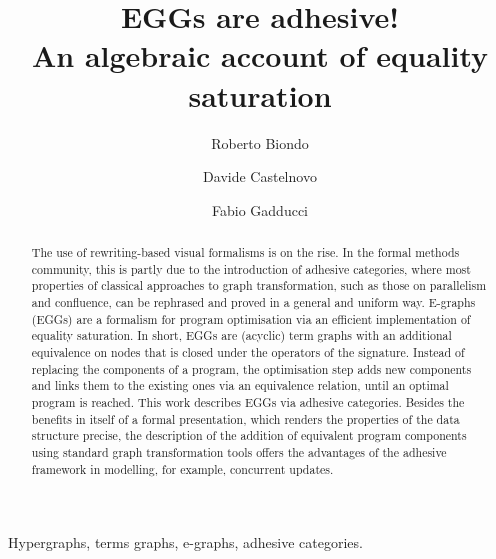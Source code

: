\documentclass[3p]{elsarticle}
\title{EGGs are adhesive!\\ An algebraic account of equality saturation}
\theoremstyle{remark}
\theoremstyle{definition}
\begin{document}
\author[1]{Roberto Biondo}

\author[1,mur]{Davide Castelnovo%
}

\author[1,mur]{Fabio Gadducci}




\begin{abstract}
The use of rewriting-based visual formalisms is on the rise. 
%
In the formal methods community, this is partly due to the introduction of adhesive
categories, where most properties of classical approaches to graph transformation, 
such as those on parallelism and confluence, can be rephrased and proved in a general and 
uniform way.
%
E-graphs (EGGs) are a formalism for program optimisation 
via an efficient implementation of equality saturation. 
In short, EGGs are (acyclic) term graphs with an additional
equivalence on nodes that is closed under the operators of the signature.
Instead of replacing the components of a program, the optimisation step 
adds new components and links them to 
the existing ones via an equivalence relation, until an optimal program is reached.
%
This work describes EGGs via adhesive categories. 
Besides the benefits in itself of a formal presentation, which renders the 
properties of the data structure precise, the description of the addition of equivalent 
program components using standard graph transformation tools offers the advantages 
of the adhesive framework in modelling, for example, concurrent updates.
%
\end{abstract}

\begin{keyword}
Hypergraphs, terms graphs, e-graphs, adhesive categories.
\end{keyword}
\end{document}
